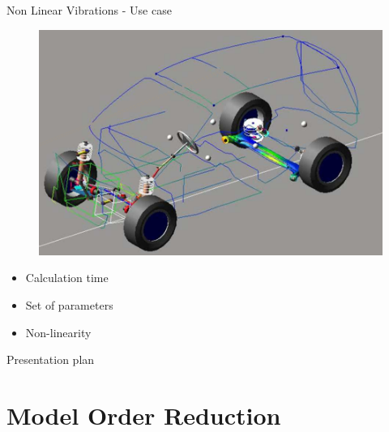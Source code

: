 \documentclass[12pt]{beamer}
\newcommand\Fontplan{\fontsize{9.5}{11}\selectfont}
\begin{document}
\begin{frame}{Non Linear Vibrations - Use case}
	\vspace{-0.4cm}
	\begin{center}
		\begin{figure}
		\begin{minipage}{0.70\linewidth}
				\includegraphics[width=1\linewidth]{roulage2.png}
			\end{minipage}
		\end{figure}
	\end{center}
	\vspace{-0.3cm}
	\begin{itemize}
		\item Calculation time
		\item Set of parameters
		\item Non-linearity
	\end{itemize}
\end{frame}

\begin{frame}{Presentation plan}
	\Fontplan
	\begin{block}{}
			\hspace{1cm}
			\begin{minipage}[l][0.650\textheight]{0.50\linewidth}
				\setcounter{tocdepth}{2}
				\tableofcontents
			\end{minipage}
			\vspace{0.5cm}
	\end{block}
\end{frame}


\section{Model Order Reduction}
\end{document}
